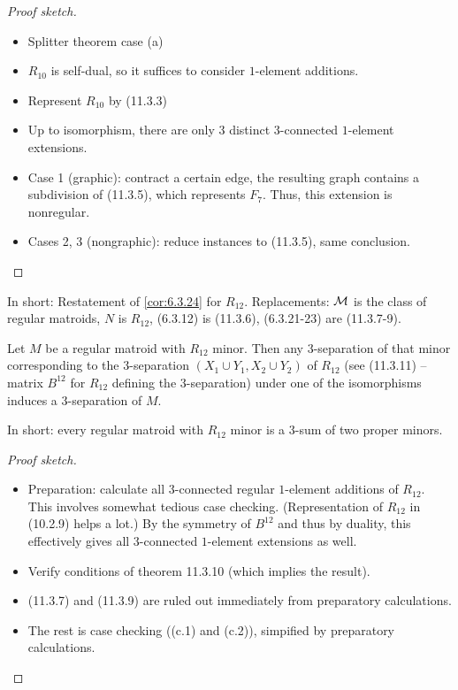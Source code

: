 \begin{proof}[Proof sketch]
  \begin{itemize}
    \item Splitter theorem case (a)
    \item $R_{10}$ is self-dual, so it suffices to consider $1$-element additions.
    \item Represent $R_{10}$ by (11.3.3)
    \item Up to isomorphism, there are only $3$ distinct $3$-connected $1$-element extensions.
    \item Case 1 (graphic): contract a certain edge, the resulting graph contains a subdivision of (11.3.5), which represents $F_{7}$. Thus, this extension is nonregular.
    \item Cases 2, 3 (nongraphic): reduce instances to (11.3.5), same conclusion.
  \end{itemize}
\end{proof}

\begin{theorem}[11.3.10]
  \label{thm:11.3.10}
  In short: Restatement of \ref{cor:6.3.24} for $R_{12}$.
  Replacements: $\mathcal{M}$ is the class of regular matroids, $N$ is $R_{12}$, (6.3.12) is (11.3.6), (6.3.21-23) are (11.3.7-9).
\end{theorem}

\begin{theorem}[11.3.12]
  \label{thm:11.3.12}
  Let $M$ be a regular matroid with $R_{12}$ minor. Then any $3$-separation of that minor corresponding to the $3$-separation $(X_{1} \cup Y_{1}, X_{2} \cup Y_{2})$ of $R_{12}$ (see (11.3.11) -- matrix $B^{12}$ for $R_{12}$ defining the $3$-separation) under one of the isomorphisms induces a $3$-separation of $M$.

  In short: every regular matroid with $R_{12}$ minor is a $3$-sum of two proper minors.
\end{theorem}

\begin{proof}[Proof sketch]
  \begin{itemize}
    \item Preparation: calculate all $3$-connected regular $1$-element additions of $R_{12}$. This involves somewhat tedious case checking. (Representation of $R_{12}$ in (10.2.9) helps a lot.) By the symmetry of $B^{12}$ and thus by duality, this effectively gives all $3$-connected $1$-element extensions as well.
    \item Verify conditions of theorem 11.3.10 (which implies the result).
    \item (11.3.7) and (11.3.9) are ruled out immediately from preparatory calculations.
    \item The rest is case checking ((c.1) and (c.2)), simpified by preparatory calculations.
  \end{itemize}
\end{proof}

